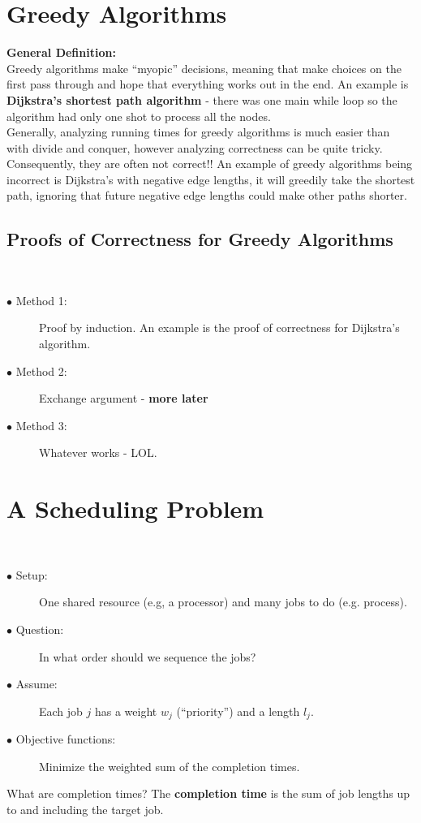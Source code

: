 \documentclass{article}
\begin{document}
\section{Greedy Algorithms}

\textbf{General Definition:} \\
Greedy algorithms make ``myopic'' decisions, meaning that make choices
on the first pass through and hope that everything works out in the end. An example is \textbf{Dijkstra's shortest path algorithm} - there was one
main while loop so the algorithm had only one shot to process all the
nodes.
\\
Generally, analyzing running times for greedy algorithms is much easier
than with divide and conquer, however analyzing correctness can be
quite tricky.  Consequently, they are often not correct!!  An example
of greedy algorithms being incorrect is Dijkstra's with negative 
edge lengths, it will greedily take the shortest path, ignoring that
future negative edge lengths could make other paths shorter.

\subsection{Proofs of Correctness for Greedy Algorithms}
\
\begin{description}
\item[$\bullet$ Method 1: ]{Proof by induction.  An example is the 
      proof of correctness for Dijkstra's algorithm.}
  \item[$\bullet$ Method 2: ]{Exchange argument - \textbf{more later}}
\item[$\bullet$ Method 3: ]{Whatever works - LOL.}
\end{description}

\section{A Scheduling Problem}
\
\begin{description}
\item[$\bullet$ Setup: ]{One shared resource (e.g, a processor) and 
  many jobs to do (e.g. process).}
\item[$\bullet$ Question: ]{In what order should we sequence the jobs?}
\item[$\bullet$ Assume: ]{Each job $j$ has a weight $w_j$ (``priority'')
    and a length $l_j$.}
\item[$\bullet$ Objective functions: ]{Minimize the weighted sum of the
    completion times.}
\end{description}
What are completion times? The \textbf{completion time} is the sum of job lengths up to and including the target job.
\end{document}
